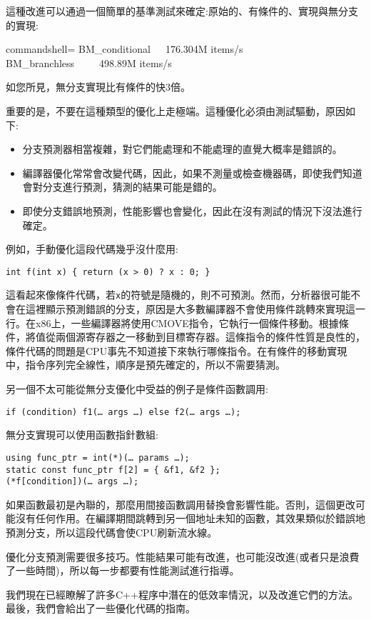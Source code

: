 這種改進可以通過一個簡單的基準測試來確定:原始的、有條件的、實現與無分支的實現:

\begin{tcblisting}{commandshell={}}
BM_conditional   176.304M items/s
BM_branchless     498.89M items/s
\end{tcblisting}

如您所見，無分支實現比有條件的快3倍。

重要的是，不要在這種類型的優化上走極端。這種優化必須由測試驅動，原因如下:

\begin{itemize}
\item
分支預測器相當複雜，對它們能處理和不能處理的直覺大概率是錯誤的。

\item
編譯器優化常常會改變代碼，因此，如果不測量或檢查機器碼，即使我們知道會對分支進行預測，猜測的結果可能是錯的。

\item
即使分支錯誤地預測，性能影響也會變化，因此在沒有測試的情況下沒法進行確定。
\end{itemize}

例如，手動優化這段代碼幾乎沒什麼用:

\begin{lstlisting}[style=styleCXX]
int f(int x) { return (x > 0) ? x : 0; }
\end{lstlisting}

這看起來像條件代碼，若\texttt{x}的符號是隨機的，則不可預測。然而，分析器很可能不會在這裡顯示預測錯誤的分支，原因是大多數編譯器不會使用條件跳轉來實現這一行。在x86上，一些編譯器將使用CMOVE指令，它執行一個條件移動。根據條件，將值從兩個源寄存器之一移動到目標寄存器。這條指令的條件性質是良性的，條件代碼的問題是CPU事先不知道接下來執行哪條指令。在有條件的移動實現中，指令序列完全線性，順序是預先確定的，所以不需要猜測。 

另一個不太可能從無分支優化中受益的例子是條件函數調用:

\begin{lstlisting}[style=styleCXX]
if (condition) f1(… args …) else f2(… args …);
\end{lstlisting}

無分支實現可以使用函數指針數組:

\begin{lstlisting}[style=styleCXX]
using func_ptr = int(*)(… params …);
static const func_ptr f[2] = { &f1, &f2 };
(*f[condition])(… args …);
\end{lstlisting}

如果函數最初是內聯的，那麼用間接函數調用替換會影響性能。否則，這個更改可能沒有任何作用。在編譯期間跳轉到另一個地址未知的函數，其效果類似於錯誤地預測分支，所以這段代碼會使CPU刷新流水線。 

優化分支預測需要很多技巧。性能結果可能有改進，也可能沒改進(或者只是浪費了一些時間)，所以每一步都要有性能測試進行指導。

我們現在已經瞭解了許多C++程序中潛在的低效率情況，以及改進它們的方法。最後，我們會給出了一些優化代碼的指南。



